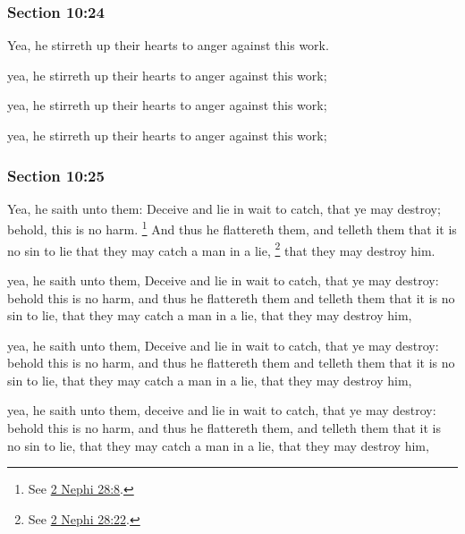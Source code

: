 	\subsubsection{Section 10:24} %
		\label{DC10-24}

		Yea, he stirreth up their hearts to anger against this work.

		\begin{framed}
		\scriptsize
			\begin{compactdesc}
				\item[JSP] yea, he stirreth up their hearts to anger against this work;
				\item[RB1] [\textit{missing}] 
				\item[DC 1835] yea, he stirreth up their hearts to anger against this work;
				\item[DC 1844] yea, he stirreth up their hearts to anger against this work; 
			\end{compactdesc}
		\end{framed}

	\subsubsection{Section 10:25} %
		\label{DC10-25}

		Yea, he saith unto them: Deceive and lie in wait to catch, that ye may destroy; behold, this is no harm.%
			\footnote{%
				See \hyperref[2NEPHI-28-8]{2 Nephi 28:8}.
				}
		And thus he flattereth them, and telleth them that it is no sin to lie that they may catch a man in a lie,%
			\footnote{%
				See \hyperref[2NEPHI-28-22]{2 Nephi 28:22}.
				}
		that they may destroy him.

		\begin{framed}
		\scriptsize
			\begin{compactdesc}
				\item[JSP] yea, he saith unto them, Deceive and lie in wait to catch, that ye may destroy: behold this is no harm, and thus he flattereth them and telleth them that it is no sin to lie, that they may catch a man in a lie, that they may destroy him,
				\item[RB1] [\textit{missing}] 
				\item[DC 1835] yea, he saith unto them, Deceive and lie in wait to catch, that ye may destroy: behold this is no harm, and thus he flattereth them and telleth them that it is no sin to lie, that they may catch a man in a lie, that they may destroy him,
				\item[DC 1844] yea, he saith unto them, deceive and lie in wait to catch, that ye may destroy: behold this is no harm, and thus he flattereth them, and telleth them that it is no sin to lie, that they may catch a man in a lie, that they may destroy him, 
			\end{compactdesc}
		\end{framed}

